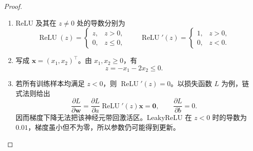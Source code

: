 \begin{proof}
    \begin{enumerate}
        \item ReLU 及其在 $z\neq0$ 处的导数分别为
        \[
            \operatorname{ReLU}(z)=
            \begin{cases}
                z, & z>0,\\
                0, & z\le0,
            \end{cases}
            \qquad
            \operatorname{ReLU}'(z)=
            \begin{cases}
                1, & z>0,\\
                0, & z<0.
            \end{cases}
        \]
        \item 写成 $\bm{x}=(x_1,x_2)^\top$。由 $x_1,x_2\ge0$，有
        \[
            z=-x_1-2x_2\le0.
        \]
        \item 若所有训练样本均满足 $z<0$，则 $\operatorname{ReLU}'(z)=0$。以损失函数 $L$ 为例，链式法则给出
        \[
            \frac{\partial L}{\partial \bm{w}}
            = \frac{\partial L}{\partial a}
              \operatorname{ReLU}'(z)\bm{x}
            = \bm{0},
            \qquad
            \frac{\partial L}{\partial b}=0.
        \]
        因而梯度下降无法把该神经元带回激活区。LeakyReLU 在 $z<0$ 时的导数为 $0.01$，梯度虽小但不为零，所以参数仍可能得到更新。
    \end{enumerate}
\end{proof}
